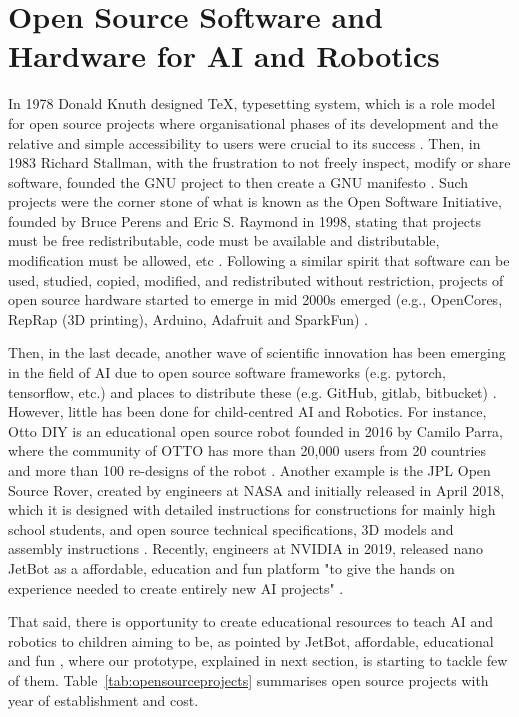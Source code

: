 \documentclass[sigconf]{acmart}
\begin{document}
\section{Open Source Software and Hardware for AI and Robotics}
In 1978 Donald Knuth designed \TeX, typesetting system, which is a role model for open source projects where organisational phases of its development and the relative and simple accessibility to users were crucial to its success \cite{gaudeul2007}.
Then, in 1983 Richard Stallman, with the frustration to not freely inspect, modify or share software, founded the GNU project to then create a GNU manifesto \cite{stallman1985}.
Such projects were the corner stone of what is known as the Open Software Initiative, founded by Bruce Perens and Eric S. Raymond in 1998, stating that projects must be free redistributable, code must be available and distributable, modification must be allowed, etc \cite{brasseur2018}.
Following a similar spirit that software can be used, studied, copied, modified, and redistributed without restriction, projects of open source hardware started to emerge in mid 2000s emerged (e.g., OpenCores, RepRap (3D printing), Arduino, Adafruit and SparkFun) \cite{pearce2013}.

Then, in the last decade, another wave of scientific innovation has been emerging in the field of AI due to open source software frameworks (e.g. pytorch, tensorflow, etc.) and places to distribute these (e.g. GitHub, gitlab, bitbucket) \cite{matelabs2017}.
However, little has been done for child-centred AI and Robotics. 
For instance, Otto DIY is an educational open source robot founded in 2016 by Camilo Parra, where the community of OTTO has more than 20,000 users from 20 countries and more than 100 re-designs of the robot \cite{OttoDIY:2016}.
Another example is the JPL Open Source Rover, created by engineers at NASA and initially released in April 2018, which it is designed with detailed instructions for constructions for mainly high school students, and open source technical specifications, 3D models and assembly instructions \cite{OSR:2018}.
Recently, engineers at NVIDIA in 2019, released nano JetBot as a affordable, education and fun platform  "to give the hands on experience needed to create entirely new AI projects" \cite{nanoJetBot:2019}. 

That said, there is opportunity to create educational resources to teach AI and robotics to children aiming to be, as pointed by JetBot, affordable, educational and fun \cite{nanoJetBot:2019}, where our prototype, explained in next section, is starting to tackle few of them. 
Table~\ref{tab:opensourceprojects} summarises open source projects with year of establishment and cost.
\end{document}
